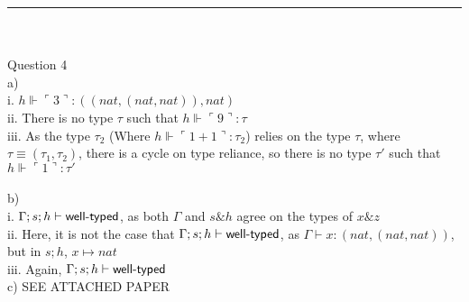 \documentclass[11pt,a4paper]{article}
\newcommand{\ad}[1]{\ulcorner {#1} \urcorner}
\newcommand{\typ}{\tau} %
\newcommand{\hptyp}[3]{#1 \Vdash #2 : #3}
\newcommand{\tcompat}[3]{#1 ; #2 ; #3 \vdash \textsf{\textup{well-typed}}}
\newcommand{\etyp}[3]{#1 \vdash #2 : #3}
\begin{document}
\clearpage \noindent
\rule{\linewidth}{0.4pt} \\ \\
Question 4 \\
\indent a) \\
\indent i. $ \hptyp{h}{\ad{3}}{((nat, (nat, nat)), nat)} $ \\
\indent ii. There is no type $\typ$ such that $\hptyp{h}{\ad{9}}{\typ}$ \\
\indent iii. As the type $\typ_2$ (Where $\hptyp{h}{\ad{1 + 1}}{\typ_2}$) relies on the type $\typ$, where $\typ \equiv (\typ_1, \typ_2)$, there is a cycle on type reliance, so there is no type $\typ'$ such that $\hptyp{h}{\ad{1}}{\typ'}$ \\ \\
\indent b) \\
\indent i. $\tcompat{\Gamma}{s}{h}$, as both $\Gamma$ and $s \& h$ agree on the types of $x \& z$ \\
\indent ii. Here, it is not the case that $\tcompat{\Gamma}{s}{h}$, as $\etyp{\Gamma}{x}{(nat,(nat, nat))}$, but in $s;h$, $x \mapsto nat$ \\
\indent iii. Again, $\tcompat{\Gamma}{s}{h}$ \\
\indent c) SEE ATTACHED PAPER
\end{document}
